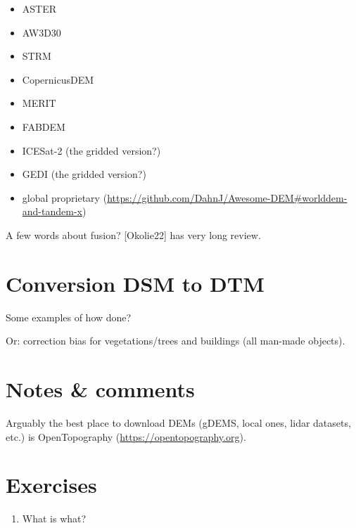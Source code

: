 \begin{itemize}
  \item ASTER
  \item AW3D30
  \item STRM
  \item CopernicusDEM
  \item MERIT
  \item FABDEM
  \item ICESat-2 (the gridded version?)
  \item GEDI (the gridded version?)
  \item global proprietary (\url{https://github.com/DahnJ/Awesome-DEM#worlddem-and-tandem-x})
\end{itemize}

A few words about fusion? [Okolie22] has very long review.


%
\section{Conversion DSM to DTM}

Some examples of how done?

Or: correction bias for vegetations/trees and buildings (all man-made objects).

%
\section{Notes \& comments}

Arguably the best place to download DEMs (gDEMS, local ones, lidar datasets, etc.) is OpenTopography (\url{https://opentopography.org}).


%
\section{Exercises}

\begin{enumerate}
  \item What is what?
\end{enumerate}
